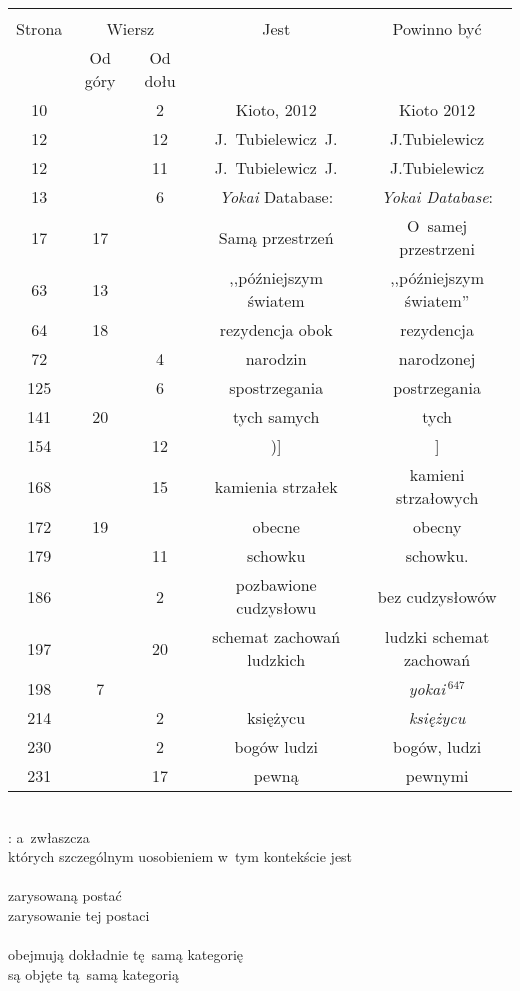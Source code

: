 \documentclass[a4paper,11pt]{article}
\begin{document}
\begin{center}
  \begin{tabular}{|c|c|c|c|c|}
    \hline
    & \multicolumn{2}{c|}{} & & \\
    Strona & \multicolumn{2}{c|}{Wiersz} & Jest
                              & Powinno być \\ \cline{2-3}
    & Od góry & Od dołu & & \\
    \hline
    10  & &  2 & Kioto, 2012 & Kioto 2012 \\
    12  & & 12 & J.~Tubielewicz~J. & J.Tubielewicz \\
    12  & & 11 & J.~Tubielewicz~J. & J.Tubielewicz \\
    13  & &  6 & \emph{Yokai} Database: & \emph{Yokai Database}: \\
    17  & 17 & & Samą przestrzeń & O~samej przestrzeni \\
    63  & 13 & & ,,późniejszym światem & ,,późniejszym światem'' \\
    64  & 18 & & rezydencja obok & rezydencja \\
    72  & &  4 & narodzin & narodzonej \\
    125 & &  6 & spostrzegania & postrzegania \\
    141 & 20 & & tych samych & tych \\
    154 & & 12 & )] & ] \\
    168 & & 15 & kamienia strzałek & kamieni strzałowych \\
    172 & 19 & & obecne & obecny \\
    179 & & 11 & schowku & schowku. \\
    186 & &  2 & pozbawione cudzysłowu & bez cudzysłowów \\
    197 & & 20 & schemat zachowań ludzkich & ludzki schemat zachowań \\
    198 &  7 & & & \emph{yokai$\,^{647}$} \\  %
    214 & &  2 & księżycu & \emph{księżycu} \\
    230 & &  2 & bogów ludzi & bogów, ludzi \\
    231 & & 17 & pewną & pewnymi \\
    \hline
  \end{tabular}
\end{center}
\noi
{} \\
\Jest: a~zwłaszcza \\
\Pow których szczególnym uosobieniem w~tym kontekście jest \\
 \\
\Jest zarysowaną postać \\
\Pow zarysowanie tej postaci \\
 \\
\Jest obejmują dokładnie tę~samą kategorię \\
\Pow są objęte tą~samą kategorią \\
\end{document}
